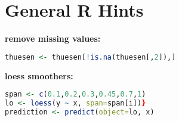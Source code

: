 \section{General R Hints}
\textbf{remove missing values: } \begin{lstlisting}[language = R]
thuesen <- thuesen[!is.na(thuesen[,2]),]
\end{lstlisting}
\textbf{loess smoothers: } \begin{lstlisting}[language = R]
span <- c(0.1,0.2,0.3,0.45,0.7,1)
lo <- loess(y ~ x, span=span[i])}
prediction <- predict(object=lo, x)
\end{lstlisting}